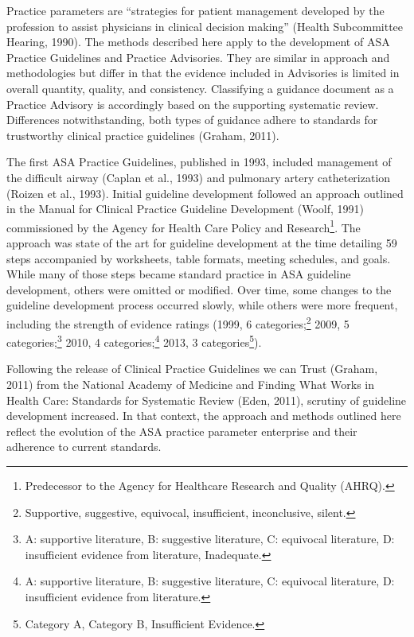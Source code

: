 \documentclass[
  letterpaper,
  DIV=11,
  numbers=noendperiod]{scrreprt}
\begin{document}
Practice parameters are ``strategies for patient management developed by
the profession to assist physicians in clinical decision making''
(Health Subcommittee Hearing, 1990). The methods described here apply to
the development of ASA Practice Guidelines and Practice Advisories. They
are similar in approach and methodologies but differ in that the
evidence included in Advisories is limited in overall quantity, quality,
and consistency. Classifying a guidance document as a Practice Advisory
is accordingly based on the supporting systematic review. Differences
notwithstanding, both types of guidance adhere to standards for
trustworthy clinical practice guidelines (Graham, 2011).

The first ASA Practice Guidelines, published in 1993, included
management of the difficult airway (Caplan et al., 1993) and pulmonary
artery catheterization (Roizen et al., 1993). Initial guideline
development followed an approach outlined in the Manual for Clinical
Practice Guideline Development (Woolf, 1991) commissioned by the Agency
for Health Care Policy and Research\footnote{Predecessor to the Agency
  for Healthcare Research and Quality (AHRQ).}. The approach was state
of the art for guideline development at the time detailing 59 steps
accompanied by worksheets, table formats, meeting schedules, and goals.
While many of those steps became standard practice in ASA guideline
development, others were omitted or modified. Over time, some changes to
the guideline development process occurred slowly, while others were
more frequent, including the strength of evidence ratings (1999, 6
categories;\footnote{Supportive, suggestive, equivocal, insufficient,
  inconclusive, silent.} 2009, 5 categories;\footnote{A: supportive
  literature, B: suggestive literature, C: equivocal literature, D:
  insufficient evidence from literature, Inadequate.}⁠ 2010, 4
categories;\footnote{A: supportive literature, B: suggestive literature,
  C: equivocal literature, D: insufficient evidence from literature.}
2013, 3 categories\footnote{Category A, Category B, Insufficient
  Evidence.}). ⁠

Following the release of Clinical Practice Guidelines we can Trust
(Graham, 2011) from the National Academy of Medicine and Finding What
Works in Health Care: Standards for Systematic Review (Eden, 2011),
scrutiny of guideline development increased. In that context, the
approach and methods outlined here reflect the evolution of the ASA
practice parameter enterprise and their adherence to current standards.
\end{document}
